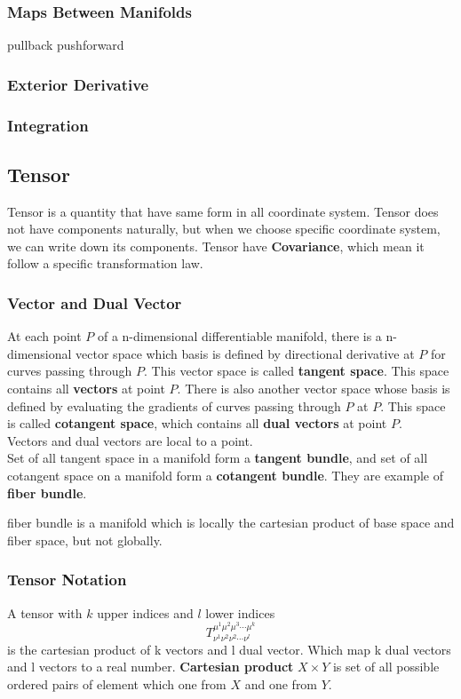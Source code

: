 \documentclass[12pt]{article}
\theoremstyle{mystyle}{\newtheorem{definition}{Definition}[section]}
\theoremstyle{mystyle}{\newtheorem{theorem}[definition]{Theorem}}
\theoremstyle{mystyle}{\newtheorem*{remark}{Remark}}
\theoremstyle{mystyle}{\newtheorem*{example}{Example}}
\theoremstyle{mystyle}{\newtheorem*{examples}{Examples}}
\theoremstyle{cstyle}{\newtheorem*{cthm}{}}
\begin{document}
\subsubsection{Maps Between Manifolds}
pullback
pushforward

\subsubsection{Exterior Derivative}

\subsubsection{Integration}

\subsection{Tensor}
Tensor is a quantity that have same form in all coordinate system.
Tensor does not have components naturally, but when we choose specific coordinate system, we can write down its components.
Tensor have \textbf{Covariance}, which mean it follow a specific transformation law.

\subsubsection{Vector and Dual Vector}
At each point $P$ of a n-dimensional differentiable manifold, there is a n-dimensional vector space
which basis is defined by directional derivative at $P$ for curves passing through $P$.
This vector space is called \textbf{tangent space}. This space contains all \textbf{vectors} at point $P$.
There is also another vector space whose basis is defined by evaluating the gradients of curves passing through $P$ at $P$.
This space is called \textbf{cotangent space}, which contains all \textbf{dual vectors} at point $P$.\\
Vectors and dual vectors are local to a point.\\
Set of all tangent space in a manifold form a \textbf{tangent bundle}, and set of all cotangent space on a manifold
form a \textbf{cotangent bundle}. They are example of \textbf{fiber bundle}.
\begin{definition}
  fiber bundle is a manifold which is locally the cartesian product of base space and fiber space, but not globally.
\end{definition}

\subsubsection{Tensor Notation}
A tensor with \(k\) upper indices and \(l\) lower indices
\[T^{\mu^1 \mu^2 \mu^3 \cdots \mu^k}_{\nu^1\nu^2\nu^2\cdots \nu^l}\]
is the cartesian product of k vectors and l dual vector. Which map k dual vectors and l vectors to a real number.
\textbf{Cartesian product} $X \times Y$ is set of all possible ordered pairs of element which one from $X$ and one from $Y$.
\end{document}
